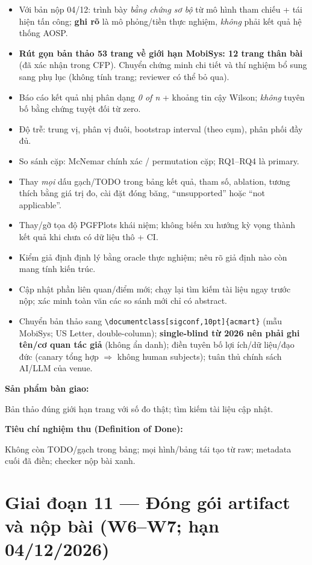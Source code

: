 \documentclass[11pt,a4paper]{article}
\newcommand{\code}[1]{\texttt{\small #1}}
\newcommand{\dod}[1]{\par\vspace{0.3em}\noindent\textbf{\color{shgreen}Tiêu chí nghiệm thu (Definition of Done):}\par\vspace{0.2em}\noindent #1}
\newcommand{\deliverable}[1]{\par\vspace{0.3em}\noindent\textbf{\color{shblue}Sản phẩm bàn giao:}\par\vspace{0.2em}\noindent #1}
\begin{document}
\begin{itemize}
  \item Với bản nộp 04/12: trình bày \emph{bằng chứng sơ bộ} từ mô hình tham chiếu + tái hiện tấn công; \textbf{ghi rõ} là mô phỏng/tiền thực nghiệm, \emph{không} phải kết quả hệ thống AOSP.
  \item \textbf{Rút gọn bản thảo 53 trang về giới hạn MobiSys: 12 trang thân bài} (đã xác nhận trong CFP). Chuyển chứng minh chi tiết và thí nghiệm bổ sung sang phụ lục (không tính trang; reviewer có thể bỏ qua).
  \item Báo cáo kết quả nhị phân dạng \emph{0 of n} + khoảng tin cậy Wilson; \emph{không} tuyên bố bằng chứng tuyệt đối từ zero.
  \item Độ trễ: trung vị, phân vị đuôi, bootstrap interval (theo cụm), phân phối đầy đủ.
  \item So sánh cặp: McNemar chính xác / permutation cặp; RQ1--RQ4 là primary.
  \item Thay \emph{mọi} dấu gạch/TODO trong bảng kết quả, tham số, ablation, tương thích bằng giá trị đo, cài đặt đóng băng, ``unsupported'' hoặc ``not applicable''.
  \item Thay/gỡ tọa độ PGFPlots khái niệm; không biến xu hướng kỳ vọng thành kết quả khi chưa có dữ liệu thô + CI.
  \item Kiểm giả định định lý bằng oracle thực nghiệm; nêu rõ giả định nào còn mang tính kiến trúc.
  \item Cập nhật phần liên quan/điểm mới; chạy lại tìm kiếm tài liệu ngay trước nộp; xác minh toàn văn các so sánh mới chỉ có abstract.
  \item Chuyển bản thảo sang \code{\textbackslash documentclass[sigconf,10pt]\{acmart\}} (mẫu MobiSys; US Letter, double-column); \textbf{single-blind từ 2026 nên phải ghi tên/cơ quan tác giả} (không ẩn danh); điền tuyên bố lợi ích/dữ liệu/đạo đức (canary tổng hợp $\Rightarrow$ không human subjects); tuân thủ chính sách AI/LLM của venue.
\end{itemize}

\deliverable{Bản thảo đúng giới hạn trang với số đo thật; tìm kiếm tài liệu cập nhật.}

\dod{Không còn TODO/gạch trong bảng; mọi hình/bảng tái tạo từ raw; metadata cuối đã điền; checker nộp bài xanh.}

\section{Giai đoạn 11 --- Đóng gói artifact và nộp bài (W6--W7; hạn 04/12/2026)}
\end{document}
